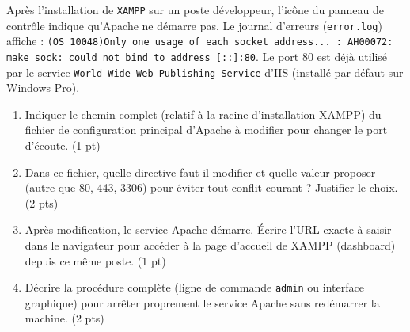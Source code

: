 \documentclass[11pt]{article}
\begin{document}
\begin{exercice}
Après l'installation de \texttt{XAMPP} sur un poste développeur, l'icône du panneau de contrôle indique qu'Apache ne démarre pas. Le journal d'erreurs (\texttt{error.log}) affiche : \texttt{(OS 10048)Only one usage of each socket address... : AH00072: make\_sock: could not bind to address [::]:80}. Le port 80 est déjà utilisé par le service \texttt{World Wide Web Publishing Service} d'IIS (installé par défaut sur Windows Pro).

\begin{enumerate}
    \item Indiquer le chemin complet (relatif à la racine d'installation XAMPP) du fichier de configuration principal d'Apache à modifier pour changer le port d'écoute. (1 pt)
    \item Dans ce fichier, quelle directive faut-il modifier et quelle valeur proposer (autre que 80, 443, 3306) pour éviter tout conflit courant ? Justifier le choix. (2 pts)
    \item Après modification, le service Apache démarre. Écrire l'URL exacte à saisir dans le navigateur pour accéder à la page d'accueil de XAMPP (dashboard) depuis ce même poste. (1 pt)
    \item Décrire la procédure complète (ligne de commande \texttt{admin} ou interface graphique) pour arrêter proprement le service Apache sans redémarrer la machine. (2 pts)
\end{enumerate}
\end{exercice}
\end{document}
